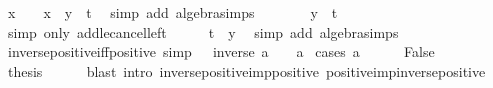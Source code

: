 \begin{isabellebody}
\ {\isachardoublequoteopen}x\ {\isacharplus}{\kern0pt}\ {}\ {\isasymle}\ x\ {\isacharplus}{\kern0pt}\ {\isacharparenleft}{\kern0pt}y\ {\isacharminus}{\kern0pt}\ t{\isacharparenright}{\kern0pt}{\isachardoublequoteclose}\ \isamarkupfalse%
\ {\isacharparenleft}{\kern0pt}simp\ add{\isacharcolon}{\kern0pt}\ algebra{\isacharunderscore}{\kern0pt}simps{\isacharparenright}{\kern0pt}\isanewline
\ \ \isamarkupfalse%
\ \isamarkupfalse%
\ {\isachardoublequoteopen}{}\ {\isasymle}\ y\ {\isacharminus}{\kern0pt}\ t{\isachardoublequoteclose}\ \isamarkupfalse%
\ {\isacharparenleft}{\kern0pt}simp\ only{\isacharcolon}{\kern0pt}\ add{\isacharunderscore}{\kern0pt}le{\isacharunderscore}{\kern0pt}cancel{\isacharunderscore}{\kern0pt}left{\isacharparenright}{\kern0pt}\isanewline
\ \ \isamarkupfalse%
\ \isamarkupfalse%
\ {\isachardoublequoteopen}t\ {\isasymle}\ y{\isachardoublequoteclose}\ \isamarkupfalse%
\ {\isacharparenleft}{\kern0pt}simp\ add{\isacharcolon}{\kern0pt}\ algebra{\isacharunderscore}{\kern0pt}simps{\isacharparenright}{\kern0pt}\isanewline
{}\isamarkupfalse%
%
\endisatagproof
{\isafoldproof}%
%
\isadelimproof
\isanewline
%
\endisadelimproof
\isanewline
{}\isamarkupfalse%
\ inverse{\isacharunderscore}{\kern0pt}positive{\isacharunderscore}{\kern0pt}iff{\isacharunderscore}{\kern0pt}positive\ {\isacharbrackleft}{\kern0pt}simp{\isacharbrackright}{\kern0pt}{\isacharcolon}{\kern0pt}\ {\isachardoublequoteopen}{\isacharparenleft}{\kern0pt}{}\ {\isacharless}{\kern0pt}\ inverse\ a{\isacharparenright}{\kern0pt}\ {\isacharequal}{\kern0pt}\ {\isacharparenleft}{\kern0pt}{}\ {\isacharless}{\kern0pt}\ a{\isacharparenright}{\kern0pt}{\isachardoublequoteclose}\isanewline
%
\isadelimproof
%
\endisadelimproof
%
\isatagproof
{}\isamarkupfalse%
\ {\isacharparenleft}{\kern0pt}cases\ {\isachardoublequoteopen}a\ {\isacharequal}{\kern0pt}\ {}{\isachardoublequoteclose}{\isacharparenright}{\kern0pt}\isanewline
\ \ \isamarkupfalse%
\ False\isanewline
\ \ \isamarkupfalse%
\ \isamarkupfalse%
\ {\isacharquery}{\kern0pt}thesis\isanewline
\ \ \ \ \isamarkupfalse%
\ {\isacharparenleft}{\kern0pt}blast\ intro{\isacharcolon}{\kern0pt}\ inverse{\isacharunderscore}{\kern0pt}positive{\isacharunderscore}{\kern0pt}imp{\isacharunderscore}{\kern0pt}positive\ positive{\isacharunderscore}{\kern0pt}imp{\isacharunderscore}{\kern0pt}inverse{\isacharunderscore}{\kern0pt}positive{\isacharparenright}{\kern0pt}\isanewline

\end{isabellebody}
